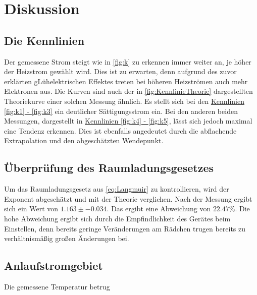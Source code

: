\section{Diskussion}
\label{sec:Diskussion}

\subsection{Die Kennlinien}
Der gemessene Strom steigt wie in \autoref{fig:k} zu erkennen immer weiter an, je höher der Heizstrom gewählt wird.
Dies ist zu erwarten, denn aufgrund des zuvor erklärten gLühelektrischen Effektes treten bei höheren Heizströmen auch mehr Elektronen aus.
Die Kurven sind auch der in \autoref{fig:KennlinieTheorie} dargestellten Theoriekurve einer solchen Messung ähnlich.
Es stellt sich bei den \hyperref[fig:k]{Kennlinien \ref{fig:k1} - \ref{fig:k3}} ein deutlicher Sättigungsstrom ein.
Bei den anderen beiden Messungen, dargestellt in \hyperref[fig:k]{Kennlinien \ref{fig:k4} - \ref{fig:k5}}, lässt sich jedoch maximal eine Tendenz erkennen. 
Dies ist ebenfalls angedeutet durch die abflachende Extrapolation und den abgeschätzten Wendepunkt.

\subsection{Überprüfung des Raumladungsgesetzes}
Um das Raumladungsgesetz aus \autoref{eq:Langmuir} zu kontrollieren, wird der Exponent abgeschätzt und mit der Theorie verglichen.
Nach der Messung ergibt sich ein Wert von $1.163\pm-0.034$.
Das ergibt eine Abweichung von $22.47 \%$.
Die hohe Abweichung ergibt sich durch die Empfindlichkeit des Gerätes beim Einstellen, denn bereits
geringe Veränderungen am Rädchen trugen bereits zu verhältnismäßig großen Änderungen bei.

\subsection{Anlaufstromgebiet}
Die gemessene Temperatur betrug 